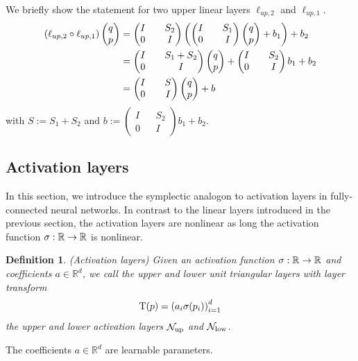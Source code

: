 \documentclass[twoside,a4paper]{article}
\newtheorem{definition}{Definition}
\begin{document}
We briefly show the statement for two upper linear layers $\ell_{up,2}$ and $\ell_{up,1}$.
\begin{align*}
	\left( \ell_{up,2} \circ \ell_{up,1} \right) \begin{pmatrix} q \\ p \end{pmatrix} &=
	\begin{pmatrix}
		I && S_2 \\
		0 && I
	\end{pmatrix}
	\left(
	\begin{pmatrix}
		I && S_1 \\
		0 && I
	\end{pmatrix}
	\begin{pmatrix} q \\ p \end{pmatrix} + b_1
	\right) + b_2 \\
	&= \begin{pmatrix}
		I && S_1 + S_2 \\
		0 && I
	\end{pmatrix} \begin{pmatrix} q \\ p \end{pmatrix}
	+ \begin{pmatrix}
		I && S_2 \\
		0 && I
	\end{pmatrix} b_1
	+ b_2 \\
	&= \begin{pmatrix}
		I && S \\
		0 && I
	\end{pmatrix} \begin{pmatrix} q \\ p \end{pmatrix} + b
\end{align*}
with $S := S_1 + S_2$ and $b := \begin{pmatrix}
	I && S_2 \\
	0 && I
\end{pmatrix} b_1
+ b_2$.

\subsection{Activation layers}
In this section, we introduce the symplectic analogon
to activation layers in fully-connected neural networks.
In contrast to the linear layers introduced in the previous section,
the activation layers are nonlinear as long the activation
function $\sigma : \mathbb{R} \to \mathbb{R}$ is nonlinear.

\begin{definition}
	(Activation layers)
	Given an activation function $\sigma : \mathbb{R} \to \mathbb{R}$ and coefficients $a \in \mathbb{R}^d$, 
	we call the upper and lower unit triangular layers with layer transform
	\begin{equation*}
		\mathrm{T}(p) = \left( a_i \sigma(p_i) \right)_{i=1}^d
	\end{equation*}
	the upper and lower activation layers $\mathcal{N}_{\text{up}}$ and $\mathcal{N}_{\text{low}}$.
\end{definition}
The coefficients $a \in \mathbb{R}^d$ are learnable parameters.
\end{document}
